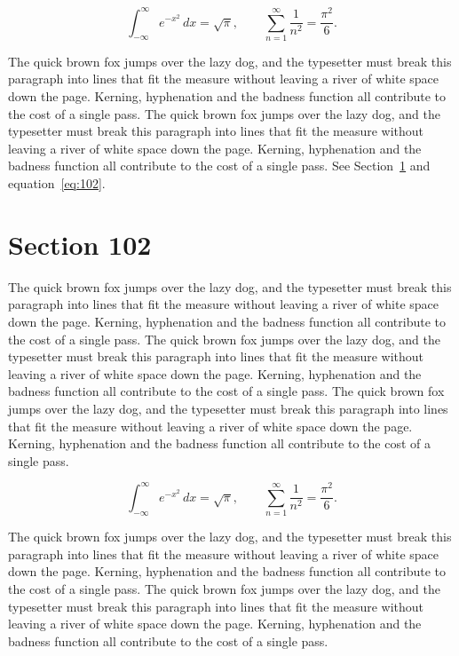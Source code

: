 \documentclass{article}
\begin{document}
\begin{equation}\label{eq:101}
\int_{-\infty}^{\infty} e^{-x^{2}}\,dx = \sqrt{\pi}, \qquad
\sum_{n=1}^{\infty} \frac{1}{n^{2}} = \frac{\pi^{2}}{6}.
\end{equation}

The quick brown fox jumps over the lazy dog, and the typesetter must break this paragraph into lines that fit the measure without leaving a river of white space down the page. Kerning, hyphenation and the badness function all contribute to the cost of a single pass. The quick brown fox jumps over the lazy dog, and the typesetter must break this paragraph into lines that fit the measure without leaving a river of white space down the page. Kerning, hyphenation and the badness function all contribute to the cost of a single pass. 
See Section~\ref{sec:102} and equation~\eqref{eq:102}.
\section{Section 102}
\label{sec:102}
The quick brown fox jumps over the lazy dog, and the typesetter must break this paragraph into lines that fit the measure without leaving a river of white space down the page. Kerning, hyphenation and the badness function all contribute to the cost of a single pass. The quick brown fox jumps over the lazy dog, and the typesetter must break this paragraph into lines that fit the measure without leaving a river of white space down the page. Kerning, hyphenation and the badness function all contribute to the cost of a single pass. The quick brown fox jumps over the lazy dog, and the typesetter must break this paragraph into lines that fit the measure without leaving a river of white space down the page. Kerning, hyphenation and the badness function all contribute to the cost of a single pass. 

\begin{equation}\label{eq:102}
\int_{-\infty}^{\infty} e^{-x^{2}}\,dx = \sqrt{\pi}, \qquad
\sum_{n=1}^{\infty} \frac{1}{n^{2}} = \frac{\pi^{2}}{6}.
\end{equation}

The quick brown fox jumps over the lazy dog, and the typesetter must break this paragraph into lines that fit the measure without leaving a river of white space down the page. Kerning, hyphenation and the badness function all contribute to the cost of a single pass. The quick brown fox jumps over the lazy dog, and the typesetter must break this paragraph into lines that fit the measure without leaving a river of white space down the page. Kerning, hyphenation and the badness function all contribute to the cost of a single pass. 
\end{document}
